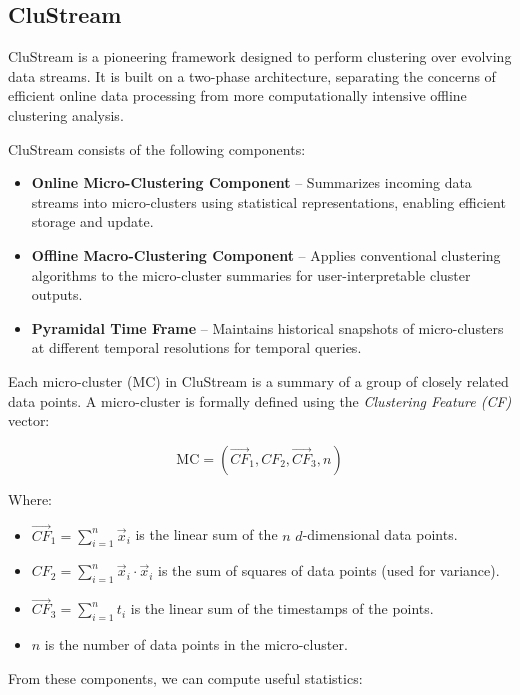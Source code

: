\subsection{CluStream}\label{subsec:clustream}

CluStream is a pioneering framework designed to perform clustering over
evolving data streams. It is built on a two-phase architecture, separating the
concerns of efficient online data processing from more computationally
intensive offline clustering analysis.

CluStream consists of the following components:

\begin{itemize}
    \item \textbf{Online Micro-Clustering Component} – Summarizes incoming data streams into
          micro-clusters using statistical representations, enabling efficient storage and update.
    \item \textbf{Offline Macro-Clustering Component} – Applies conventional clustering
          algorithms to the micro-cluster summaries for user-interpretable cluster outputs.
    \item \textbf{Pyramidal Time Frame} – Maintains historical snapshots of micro-clusters
          at different temporal resolutions for temporal queries.
\end{itemize}

Each micro-cluster (MC) in CluStream is a summary of a group of closely related
data points. A micro-cluster is formally defined using the \textit{Clustering
    Feature (CF)} vector:

\begin{equation}
    \text{MC} = \left( \vec{CF}_1, CF_2, \vec{CF}_3, n \right)
\end{equation}

Where:
\begin{itemize}
    \item $\vec{CF}_1 = \sum_{i=1}^{n} \vec{x}_i$ is the linear sum of the $n$ $d$-dimensional data points.
    \item $CF_2 = \sum_{i=1}^{n} \vec{x}_i \cdot \vec{x}_i$ is the sum of squares of data points
          (used for variance).
    \item $\vec{CF}_3 = \sum_{i=1}^{n} t_i$ is the linear sum of the timestamps of the points.
    \item $n$ is the number of data points in the micro-cluster.
\end{itemize}

From these components, we can compute useful statistics:


